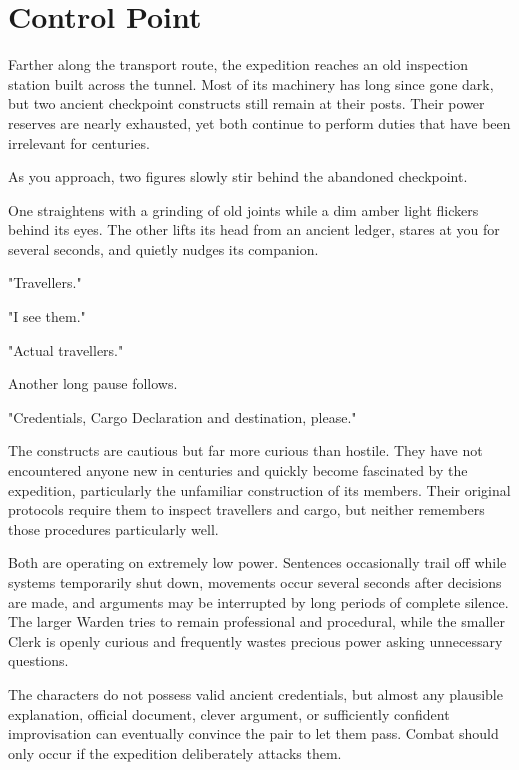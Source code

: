 \section*{ Control Point}
{\entryfont Farther along the transport route, the expedition reaches an old inspection station built across the tunnel. Most of its machinery has long since gone dark, but two ancient checkpoint constructs still remain at their posts. Their power reserves are nearly exhausted, yet both continue to perform duties that have been irrelevant for centuries.}
\begin{DndReadAloud}
	As you approach, two figures slowly stir behind the abandoned checkpoint.

	One straightens with a grinding of old joints while a dim amber light flickers behind its eyes. The other lifts its head from an ancient ledger, stares at you for several seconds, and quietly nudges its companion.

	"Travellers."

	"I see them."

	"Actual travellers."

	Another long pause follows.

	"Credentials, Cargo Declaration and destination, please."
\end{DndReadAloud}
{\noindent\entryfont The constructs are cautious but far more curious than hostile. They have not encountered anyone new in centuries and quickly become fascinated by the expedition, particularly the unfamiliar construction of its members. Their original protocols require them to inspect travellers and cargo, but neither remembers those procedures particularly well.

Both are operating on extremely low power. Sentences occasionally trail off while systems temporarily shut down, movements occur several seconds after decisions are made, and arguments may be interrupted by long periods of complete silence. The larger Warden tries to remain professional and procedural, while the smaller Clerk is openly curious and frequently wastes precious power asking unnecessary questions.

The characters do not possess valid ancient credentials, but almost any plausible explanation, official document, clever argument, or sufficiently confident improvisation can eventually convince the pair to let them pass. Combat should only occur if the expedition deliberately attacks them.}

